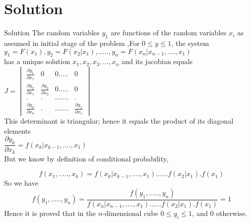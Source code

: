 \documentclass{beamer}
\begin{document}
	\section{Solution}
	\begin{frame}{Solution}
	The random variables $ y_{1} $ are functions of the random variables $ x_{i}$ as assumed in initial stage of the problem ,For $  0 \leq y \leq 1 $, the system  \\
	$ y_{1}=F(x_{1}) ,y_{2}=F(x_{2}|x_{1}), ..... , y_{n}=F(x_{n}|x_{n-1},....,x_1{})  $\\
	has a unique solution $ x_{1},x_{2},x_{3},...,x_{n} $ and its jacobian equals \\
	$ J= \begin{vmatrix} \frac{ {\partial } y_{1}}{{ \partial } x_{1}}& 0 &0 .....&0 \\ \frac{{ \partial } y_{2}}{{\partial}x_{1}} & \frac{{\partial}y_{2}}{{\partial}x_{2}} &0 .....&0 \\ .&.&.......&. \\ \frac{{\partial}y_{n}}{{\partial}x_{n}} & . &.. .....& \frac{{\partial}y_{1}}{{\partial}x_{1}} \end{vmatrix}  $\\
	This determinant is triangular; hence it equals the product of its diagonal elements \\
	$ \dfrac{{\partial } y_{k}}{{\partial}x_{k}}=f(x_{k}|x_{k-1},....,x_{1}) $\\
	But we know by definition of conditional probability,\\
	\end{frame}
\begin{frame}
 \begin{equation}
 	f(x_{1},.....,x_{k})=f(x_{k}|x_{k-1},....,x_{1})......f(x_{2}|x_{1}).f(x_{1})
 \end{equation}
 So we have \\
 \begin{equation}
 	f(y_{1},.....,y_{n})=\dfrac{f(y_{1},.....,y_{n})}{f(x_{n}|x_{n-1},....,x_{1})......f(x_{2}|x_{1}).f(x_{1})}=1
 \end{equation}
 Hence it is proved that in the $ n $-dimensional cube $  0 \leq y_{i} \leq 1 $, and 0 otherwise. 
\end{frame}
\end{document}
